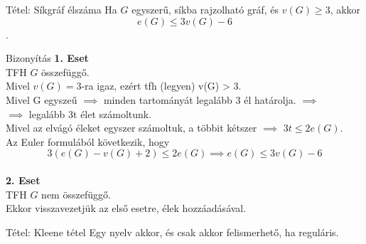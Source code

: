 \documentclass{beamer}
\begin{document}
\begin{frame}
\begin{block}{Tétel: Síkgráf élszáma}
 Ha $G$ egyszerű, síkba rajzolható gráf, és $v(G) \geq 3$, akkor $$e(G) \leq 3v(G) - 6$$.

\end{block}

\begin{block}{Bizonyítás}
\textbf{1. Eset}\\
TFH $G$ összefüggő.\\
Mivel $v(G) = 3$-ra igaz, ezért tfh (legyen) v(G) > 3.\\
Mivel G egyszeű $\implies$ minden tartományát legalább 3 él határolja. $\implies$\\
$\implies$ legalább 3t élet számoltunk.\\
Mivel az elvágó éleket egyszer számoltuk, a többit kétszer $\implies$ $3t \leq 2e(G)$.\\
Az Euler formulából következik, hogy $$3(e(G) - v(G) + 2) \leq 2e(G) \implies e(G) \leq 3v(G) - 6$$\\
\smallskip
\textbf{2. Eset}\\
TFH $G$ nem összefüggő.\\
Ekkor visszavezetjük az első esetre, élek hozzáadásával.

\end{block}

\end{frame}



\begin{frame}[plain]
\end{frame}

\begin{frame}
\begin{block}{Tétel: Kleene tétel}
Egy nyelv akkor, és csak akkor felismerhető, ha reguláris.

\end{block}

\end{frame}
\end{document}
